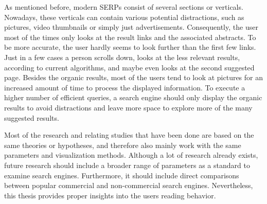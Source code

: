 As mentioned before, modern SERPs consist of several sections or verticals. Nowadays, these verticals can contain various potential distractions, such as pictures, video thumbnails or simply just advertisements.   
Consequently, the user most of the times only looks at the result links and the associated abstracts. To be more accurate, the user hardly seems to look further than the first few links. Just in a few cases a person scrolls down, looks at the less relevant results, according to current algorithms, and maybe even looks at the second suggested page.
Besides the organic results, most of the users tend to look at pictures for an increased amount of time to process the displayed information.
To execute a higher number of efficient queries, a search engine should only display the organic results to avoid distractions and leave more space to explore more of the many suggested results.

Most of the research and relating studies that have been done are based on the same theories or hypotheses, and therefore also mainly work with the same parameters and visualization methods. 
Although a lot of research already exists, future research should include a broader range of parameters as a standard to examine search engines. Furthermore, it should include direct comparisons between popular commercial and non-commercial search engines.
Nevertheless, this thesis provides proper insights into the users reading behavior.



